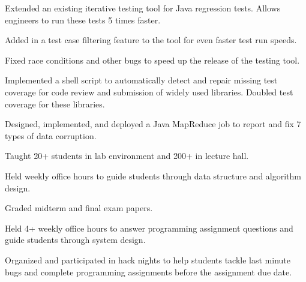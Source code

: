 \documentclass[letterpaper]{deedy-resume} %
\begin{document}
\begin{minipage}[t]{0.71\textwidth}
\begin{tightitemize}
\item Extended an existing iterative testing tool for Java regression tests. Allows engineers to run these tests 5 times faster.
\item Added in a test case filtering feature to the tool for even faster test run speeds.
\item Fixed race conditions and other bugs to speed up the release of the testing tool.
\end{tightitemize}

\sectionspace %




\begin{tightitemize}
\item Implemented a shell script to automatically detect and repair missing test coverage for code review and submission of widely used libraries. Doubled test coverage for these libraries.
\item Designed, implemented, and deployed a Java MapReduce job to report and fix 7 types of data corruption.
\end{tightitemize}

\sectionspace %



\begin{tightitemize}
\item Taught 20+ students in lab environment and 200+ in lecture hall.
\item Held weekly office hours to guide students through data structure and algorithm design.
\item Graded midterm and final exam papers.
\end{tightitemize}

\sectionspace %

\begin{tightitemize}
\item Held 4+ weekly office hours to answer programming assignment questions and guide students through system design.
\item Organized and participated in hack nights to help students tackle last minute bugs and complete programming assignments before the assignment due date.
\end{tightitemize}


\end{minipage}
\end{document}
